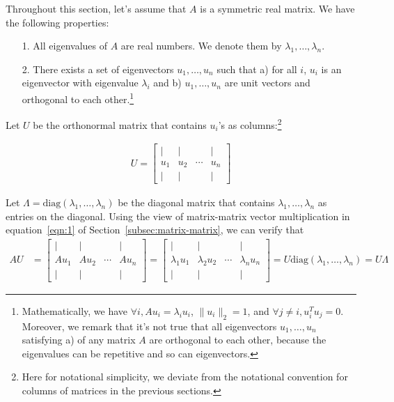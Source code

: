 \documentclass[12pt]{article}
\begin{document}


Throughout this section, let's assume that $A$ is a symmetric real matrix. We have the following properties: 

\begin{itemize}
	\item[1.] All eigenvalues of $A$ are real numbers. We denote them by $\lambda_1,\dots, \lambda_n$. 
	\item[2.] There exists a set of eigenvectors $u_1,\dots, u_n$ such that a) for all $i$, $u_i$ is an eigenvector with eigenvalue $\lambda_i$ and b) $u_1,\dots, u_n$ are unit vectors and orthogonal to each other.\footnote{Mathematically, we have $\forall i,  Au_i = \lambda_i u_i$, $\|u_i\|_2=1$, and $\forall j\neq i, u_i^Tu_j=0$. Moreover, we remark that it's not true that all eigenvectors $u_1,\dots, u_n$ satisfying a) of any matrix $A$ are orthogonal to each other, because the eigenvalues can be repetitive and so can eigenvectors.}
\end{itemize}

Let $U$ be the orthonormal matrix that contains $u_i$'s as columns:\footnote{Here for notational simplicity, we deviate from the notational convention for columns of matrices in the previous sections.}

\begin{align}
U = \left [
\begin{array}{cccc} | & | &  & | \\ u_1 & u_2 & \cdots & u_n \\ | &
| &  & | \end{array} \right ]
\end{align}

Let $\Lambda  =
\mathrm{diag}(\lambda_1, \ldots, \lambda_n)$ be the diagonal matrix that contains $\lambda_1,\dots, \lambda_n$ as entries on the diagonal. Using the view of matrix-matrix vector multiplication in equation~\eqref{eqn:1} of Section~\ref{subsec:matrix-matrix}, we can verify that 
\begin{align}
AU & =  \left [
\begin{array}{cccc} | & | &  & | \\A u_1 & Au_2 & \cdots & Au_n \\ | &
| &  & | \end{array} \right ] =  \left [
\begin{array}{cccc} | & | &  & | \\ \lambda_1 u_1 & \lambda_2 u_2 & \cdots & \lambda_n u_n \\ | &
| &  & | \end{array} \right ]  = U\mathrm{diag}(\lambda_1, \ldots, \lambda_n) = U\Lambda \nonumber
\end{align}
\end{document}
